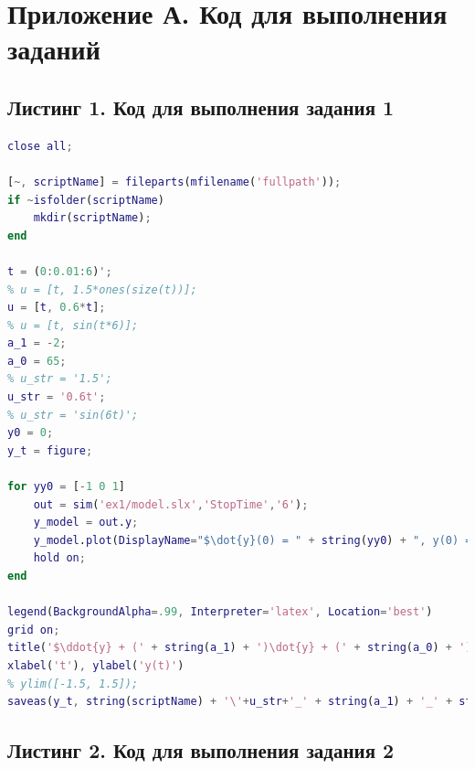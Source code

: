 \documentclass[a4paper]{article}
\begin{document}
\section{Приложение А. Код для выполнения заданий}

\subsection*{Листинг 1. Код для выполнения задания 1}

\begin{lstlisting}[caption={Код для построения графиков для задания 1}, language=matlab]
% clear all;
close all;

[~, scriptName] = fileparts(mfilename('fullpath'));
if ~isfolder(scriptName)
    mkdir(scriptName);
end

t = (0:0.01:6)';
% u = [t, 1.5*ones(size(t))];
u = [t, 0.6*t];
% u = [t, sin(t*6)];
a_1 = -2;
a_0 = 65;
% u_str = '1.5';
u_str = '0.6t';
% u_str = 'sin(6t)';
y0 = 0;
y_t = figure;

for yy0 = [-1 0 1]
    out = sim('ex1/model.slx','StopTime','6');
    y_model = out.y;
    y_model.plot(DisplayName="$\dot{y}(0) = " + string(yy0) + ", y(0) = 0$", LineWidth=1.2)
    hold on;
end

legend(BackgroundAlpha=.99, Interpreter='latex', Location='best')
grid on;
title('$\ddot{y} + (' + string(a_1) + ')\dot{y} + (' + string(a_0) + ')y = ' + string(a_0) + 'u, u(t) = '+ u_str + '$', 'Interpreter', 'latex', FontWeight='normal')
xlabel('t'), ylabel('y(t)')
% ylim([-1.5, 1.5]);
saveas(y_t, string(scriptName) + '\'+u_str+'_' + string(a_1) + '_' + string(a_0) + '.eps', 'epsc')
\end{lstlisting}

\subsection*{Листинг 2. Код для выполнения задания 2}
\end{document}
